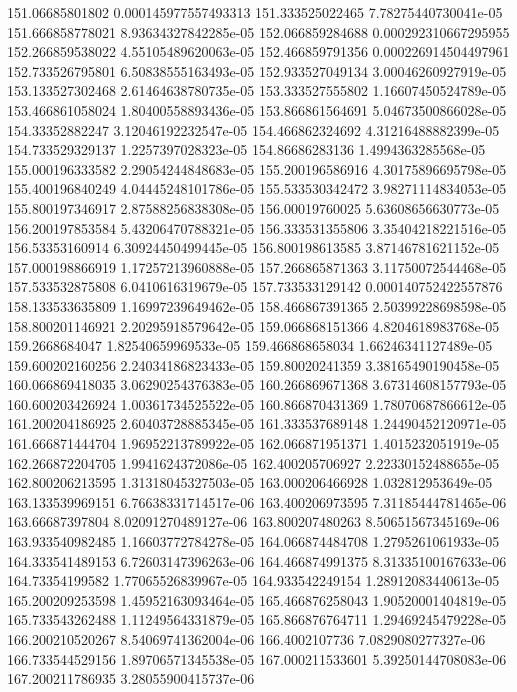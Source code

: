 {151.06685801802 0.000145977557493313
151.333525022465 7.78275440730041e-05
151.666858778021 8.93634327842285e-05
152.066859284688 0.000292310667295955
152.266859538022 4.55105489620063e-05
152.466859791356 0.000226914504497961
152.733526795801 6.50838555163493e-05
152.933527049134 3.00046260927919e-05
153.133527302468 2.61464638780735e-05
153.333527555802 1.16607450524789e-05
153.466861058024 1.80400558893436e-05
153.866861564691 5.04673500866028e-05
154.33352882247 3.12046192232547e-05
154.466862324692 4.31216488882399e-05
154.733529329137 1.2257397028323e-05
154.86686283136 1.4994363285568e-05
155.000196333582 2.29054244848683e-05
155.200196586916 4.30175896695798e-05
155.400196840249 4.04445248101786e-05
155.533530342472 3.98271114834053e-05
155.800197346917 2.87588256838308e-05
156.00019760025 5.63608656630773e-05
156.200197853584 5.43206470788321e-05
156.333531355806 3.35404218221516e-05
156.53353160914 6.30924450499445e-05
156.800198613585 3.87146781621152e-05
157.000198866919 1.17257213960888e-05
157.266865871363 3.11750072544468e-05
157.533532875808 6.0410616319679e-05
157.733533129142 0.000140752422557876
158.133533635809 1.16997239649462e-05
158.466867391365 2.50399228698598e-05
158.800201146921 2.20295918579642e-05
159.066868151366 4.8204618983768e-05
159.2668684047 1.82540659969533e-05
159.466868658034 1.66246341127489e-05
159.600202160256 2.24034186823433e-05
159.80020241359 3.38165490190458e-05
160.066869418035 3.06290254376383e-05
160.266869671368 3.67314608157793e-05
160.600203426924 1.00361734525522e-05
160.866870431369 1.78070687866612e-05
161.200204186925 2.60403728885345e-05
161.333537689148 1.24490452120971e-05
161.666871444704 1.96952213789922e-05
162.066871951371 1.4015232051919e-05
162.266872204705 1.9941624372086e-05
162.400205706927 2.22330152488655e-05
162.800206213595 1.31318045327503e-05
163.000206466928 1.032812953649e-05
163.133539969151 6.76638331714517e-06
163.400206973595 7.31185444781465e-06
163.66687397804 8.02091270489127e-06
163.800207480263 8.50651567345169e-06
163.933540982485 1.16603772784278e-05
164.066874484708 1.2795261061933e-05
164.333541489153 6.72603147396263e-06
164.466874991375 8.31335100167633e-06
164.73354199582 1.77065526839967e-05
164.933542249154 1.28912083440613e-05
165.200209253598 1.45952163093464e-05
165.466876258043 1.90520001404819e-05
165.733543262488 1.11249564331879e-05
165.866876764711 1.29469245479228e-05
166.200210520267 8.54069741362004e-06
166.4002107736 7.0829080277327e-06
166.733544529156 1.89706571345538e-05
167.000211533601 5.39250144708083e-06
167.200211786935 3.28055900415737e-06
}
